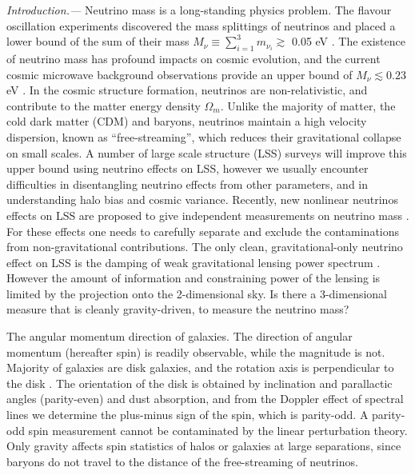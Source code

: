\documentclass[aps,prd,twocolumn,amsmath,amssymb,amsfont,superscriptaddress,nofootinbib]{revtex4-1}
\begin{document}
\textit{Introduction.---}
Neutrino mass is a long-standing physics problem. 
The flavour oscillation experiments \citep{2002PhRvL..89a1301A} discovered the mass 
splittings of neutrinos and placed a lower bound of the sum of their mass 
$M_\nu \equiv \sum_{i=1}^3 m_{\nu_i} \gtrsim$ 0.05 eV \citep{2014ChPhC..38i0001O}. 
The existence of neutrino mass has profound impacts on cosmic evolution, and the current cosmic microwave background observations provide an 
upper bound of $M_\nu\lesssim 0.23$ eV \citep{2016A&A...594A..13P}. 
In the cosmic structure formation, neutrinos are non-relativistic, 
and contribute to the matter energy density $\Omega_m$. 
Unlike the majority of matter, the cold dark matter (CDM) and baryons, 
neutrinos maintain a high velocity dispersion, 
known as ``free-streaming'', which reduces their gravitational collapse on small scales. 
A number of large scale structure (LSS) surveys \citep{2011arXiv1110.3193L,2015AAS...22533605E}
will improve this upper bound using neutrino effects on LSS, 
however we usually encounter difficulties in disentangling neutrino effects from other parameters, 
and in understanding halo bias and cosmic variance. 
Recently, new nonlinear neutrinos effects on LSS are proposed to give independent measurements on neutrino mass \citep{2014PhRvL.113m1301Z,2016PhRvL.116n1301Z,2017NatAs...1E.143Y}. 
For these effects one needs to carefully separate and exclude the contaminations from non-gravitational contributions. 
The only clean, gravitational-only neutrino effect on LSS is the damping of weak gravitational lensing power spectrum \cite{2011arXiv1110.3193L}. 
However the amount of information and constraining power of the lensing is limited by the projection onto the 2-dimensional sky. 
Is there a 3-dimensional measure that is cleanly gravity-driven, to measure the neutrino mass?

The angular momentum direction of galaxies. 
The direction of angular momentum (hereafter spin) is readily observable, while the magnitude is not. 
Majority of galaxies are disk galaxies, and the rotation axis is perpendicular to the disk \citep{1998MNRAS.297L..71M}. 
The orientation of the disk is obtained by inclination and parallactic angles (parity-even) and dust absorption, and from the Doppler effect of spectral lines we determine the plus-minus sign of the spin, which is parity-odd.
A parity-odd spin measurement cannot be contaminated by the linear perturbation theory. 
Only gravity affects spin statistics of halos or galaxies at large separations, since baryons do not travel to the distance of the free-streaming of neutrinos.
\end{document}
